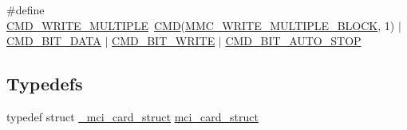 \begin{DoxyCompactItemize}
\#define \hyperlink{group___s_d_m_m_c__18_x_x__43_x_x_ga73e19a429898d5056eac01f19d11bcae}{C\+M\+D\+\_\+\+W\+R\+I\+T\+E\+\_\+\+M\+U\+L\+T\+I\+P\+LE}~\hyperlink{group___s_d_m_m_c__18_x_x__43_x_x_ga7caafa608408eea45aca375d0d5eb211}{C\+MD}(\hyperlink{group___c_h_i_p___s_d_m_m_c___definitions_ga791b2d417011f16319822320507e69fb}{M\+M\+C\+\_\+\+W\+R\+I\+T\+E\+\_\+\+M\+U\+L\+T\+I\+P\+L\+E\+\_\+\+B\+L\+O\+CK}, 1) $\vert$ \hyperlink{group___s_d_m_m_c__18_x_x__43_x_x_gac4b629fb5a202bac675389cf3e28a197}{C\+M\+D\+\_\+\+B\+I\+T\+\_\+\+D\+A\+TA} $\vert$ \hyperlink{group___s_d_m_m_c__18_x_x__43_x_x_ga78e0e4e25dd9e13cdcbecc9f396b2150}{C\+M\+D\+\_\+\+B\+I\+T\+\_\+\+W\+R\+I\+TE} $\vert$ \hyperlink{group___s_d_m_m_c__18_x_x__43_x_x_ga54467a0e80fd68c54419d4e6598c05d8}{C\+M\+D\+\_\+\+B\+I\+T\+\_\+\+A\+U\+T\+O\+\_\+\+S\+T\+OP}
\end{DoxyCompactItemize}
\subsection*{Typedefs}
\begin{DoxyCompactItemize}
\item 
typedef struct \hyperlink{struct__mci__card__struct}{\+\_\+mci\+\_\+card\+\_\+struct} \hyperlink{group___s_d_m_m_c__18_x_x__43_x_x_gaa558c8e6f8957a2a9014f575b7beabe5}{mci\+\_\+card\+\_\+struct}
\end{DoxyCompactItemize}
